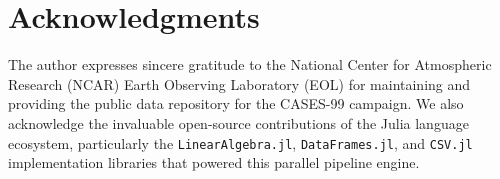 \documentclass[11pt,a4paper]{article}
\begin{document}
\section*{Acknowledgments}
The author expresses sincere gratitude to the National Center for Atmospheric Research (NCAR) Earth Observing Laboratory (EOL) for maintaining and providing the public data repository for the CASES-99 campaign. We also acknowledge the invaluable open-source contributions of the Julia language ecosystem, particularly the \texttt{LinearAlgebra.jl}, \texttt{DataFrames.jl}, and \texttt{CSV.jl} implementation libraries that powered this parallel pipeline engine.



\end{document}
